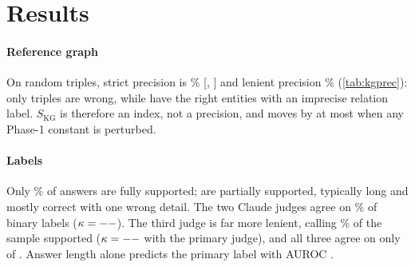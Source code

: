 \documentclass[conference]{IEEEtran}
\begin{document}
\section{Results}

\paragraph*{Reference graph}
On \KGAuditN{} random triples, strict precision is \KGPrec\% [\KGPrecLo, \KGPrecHi] and lenient precision \KGPrecLenient\%
(\cref{tab:kgprec}): only \KGNIncorrect{} triples are wrong, while \KGNPartial{} have the right entities with an imprecise
relation label. $S_{\mathrm{KG}}$ is therefore an index, not a precision, and moves by at most \SensMaxDev{} when any
Phase-1 constant is perturbed.

\TableKgprec

\paragraph*{Labels}
Only \SupportedRate\% of answers are fully supported; \NPartial{} are partially supported, typically long and mostly correct
with one wrong detail. The two Claude judges agree on \AgreeFull\% of binary labels ($\kappa=--$). The third judge
is far more lenient, calling \GeminiSupp\% of the sample supported ($\kappa=--$ with the primary judge), and all
three agree on only \NUnanimous{} of \CrossJudgeN. Answer length alone predicts the primary label with AUROC \LenAUC.
\end{document}
